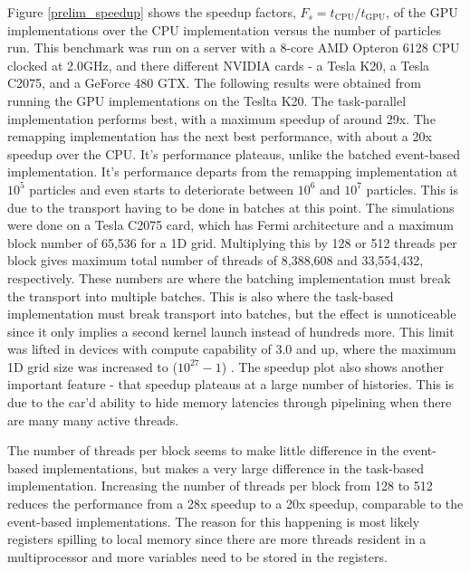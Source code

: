 Figure \ref{prelim_speedup} shows the speedup factors, $F_s=t_\mathrm{CPU}/t_\mathrm{GPU}$, of the GPU implementations over the CPU implementation versus the number of particles run.  This benchmark was run on a server with a 8-core AMD Opteron 6128 CPU clocked at 2.0GHz, and there different NVIDIA cards - a Tesla K20, a Tesla C2075, and a GeForce 480 GTX.  The following results were obtained from running the GPU implementations on the Teslta K20.  The task-parallel implementation performs best, with a maximum speedup of around 29x.  The remapping implementation has the next best performance, with about a 20x speedup over the CPU.  It's performance plateaus, unlike the batched event-based implementation.  It's performance departs from the remapping implementation at $10^5$ particles and even starts to deteriorate between $10^6$ and $10^7$ particles.  This is due to the transport having to be done in batches at this point.  The simulations were done on a Tesla C2075 card, which has Fermi architecture and a maximum block number of 65,536 for a 1D grid.  Multiplying this by 128 or 512 threads per block gives maximum total number of threads of 8,388,608 and 33,554,432, respectively.  These numbers are where the batching implementation must break the transport into multiple batches.  This is also where the task-based implementation must break transport into batches, but the effect is unnoticeable since it only implies a second kernel launch instead of hundreds more.  This limit was lifted in devices with compute capability of 3.0 and up, where the maximum 1D grid size was increased to ($10^{27}-1$) \cite{cuda}.  The speedup plot also shows another important feature - that speedup plateaus at a large number of histories.  This is due to the car'd ability to hide memory latencies through pipelining when there are many many active threads.  

The number of threads per block seems to make little difference in the event-based implementations, but makes a very large difference in the task-based implementation.  Increasing the number of threads per block from 128 to 512 reduces the performance from a 28x speedup to a 20x speedup, comparable to the event-based implementations.  The reason for this happening is most likely registers spilling to local memory since there are more threads resident in a multiprocessor and more variables need to be stored in the registers.

